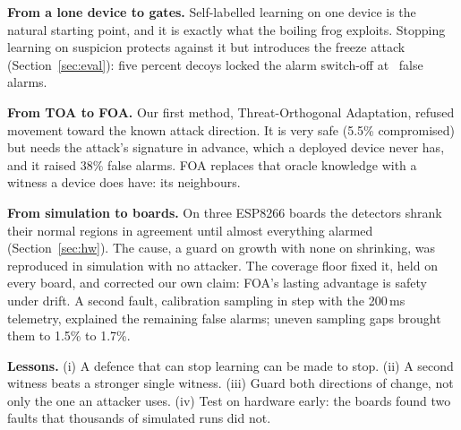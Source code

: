 \textbf{From a lone device to gates.} Self-labelled learning on one device is the natural starting point,
and it is exactly what the boiling frog exploits. Stopping learning on suspicion protects against it but
introduces the freeze attack (Section~\ref{sec:eval}): five percent decoys locked the alarm switch-off at
\KLFrozenFPR\ false alarms.

\textbf{From TOA to FOA.} Our first method, Threat-Orthogonal Adaptation, refused movement toward the
known attack direction. It is very safe (5.5\% compromised) but needs the attack's signature in advance,
which a deployed device never has, and it raised 38\% false alarms. FOA replaces that oracle knowledge
with a witness a device does have: its neighbours.

\textbf{From simulation to boards.} On three ESP8266 boards the detectors shrank their normal regions in
agreement until almost everything alarmed (Section~\ref{sec:hw}). The cause, a guard on growth with none
on shrinking, was reproduced in simulation with no attacker. The coverage floor fixed it, held on every
board, and corrected our own claim: FOA's lasting advantage is safety under drift. A second fault,
calibration sampling in step with the 200\,ms telemetry, explained the remaining false alarms; uneven
sampling gaps brought them to 1.5\% to 1.7\%.

\textbf{Lessons.} (i) A defence that can stop learning can be made to stop. (ii) A second witness beats
a stronger single witness. (iii) Guard both directions of change, not only the one an attacker uses.
(iv) Test on hardware early: the boards found two faults that thousands of simulated runs did not.
